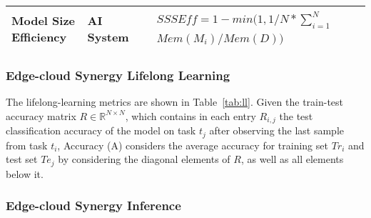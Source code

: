 \begin{table}[h!]
\begin{tabular}{|p{2cm}|l|p{6cm}|p{3cm}|p{1.5cm}|}
Model Size Efficiency
& AI System
& 
\parbox{3cm}{
    \begin{equation} \label{equ:ssse} 
    \begin{split}
& SSSEff = 1 - min(1, 1/N * \sum_{i=1}^N \\
& Mem(M_i) / Mem(D))
    \end{split} 
    \end{equation} 
}
&  
& \cite{DBLP:journals/corr/abs-1810-13166,DBLP:conf/nips/Lopez-PazR17}       
\\ \hline

\end{tabular}
\end{table}




\subsubsection{Edge-cloud Synergy Lifelong Learning}

The lifelong-learning metrics are shown in Table~\ref{tab:ll}. Given the train-test accuracy matrix $R \in \mathbb{R}^{N \times N}$, which contains in each entry $R_{i,j}$ the test classification accuracy of the model on task $t_j$ after observing the last sample from task $t_i$, Accuracy (A) considers the average accuracy for training set $Tr_i$ and test set $Te_j$ by considering the diagonal elements of $R$, as well as all elements below it. 

















\subsubsection{Edge-cloud Synergy Inference}

